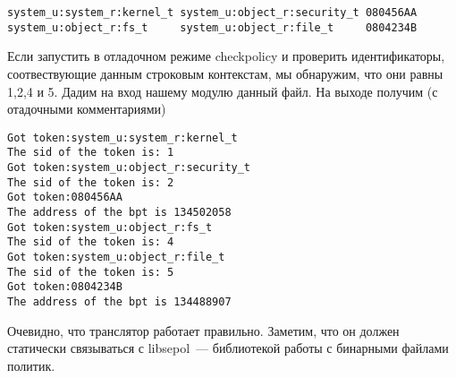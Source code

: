 \bigskip
\begin{lstlisting}
system_u:system_r:kernel_t system_u:object_r:security_t 080456AA
system_u:object_r:fs_t     system_u:object_r:file_t     0804234B
\end{lstlisting}

\bigskip
Если запустить в отладочном режиме 
checkpolicy и проверить идентификаторы,
соотвествующие данным строковым контекстам, 
мы обнаружим, что они равны 1,2,4 и 5. Дадим 
на вход нашему модулю данный файл. На выходе 
получим (с отадочными комментариями)

\begin{lstlisting}
Got token:system_u:system_r:kernel_t
The sid of the token is: 1
Got token:system_u:object_r:security_t
The sid of the token is: 2
Got token:080456AA
The address of the bpt is 134502058
Got token:system_u:object_r:fs_t
The sid of the token is: 4
Got token:system_u:object_r:file_t
The sid of the token is: 5
Got token:0804234B
The address of the bpt is 134488907
\end{lstlisting}

\bigskip
Очевидно, что транслятор работает 
правильно. Заметим, что он должен статически
связываться с libsepol~--- библиотекой 
работы с бинарными файлами политик. 




